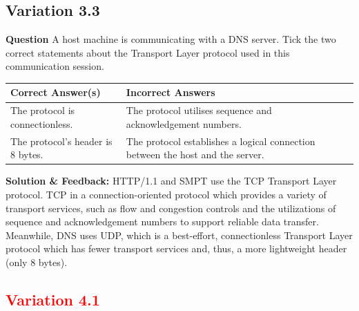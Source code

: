 \subsection{Variation 3.3}
\textbf{Question} A host machine is communicating with a DNS server. Tick the two correct statements about the Transport Layer protocol used in this communication session. \\
\begin{tabularx}{\textwidth}{|X|X|}
    \hline
    \textbf{Correct Answer(s)} & \textbf{Incorrect Answers} \\
    \hline
    The protocol is connectionless. & The protocol utilises sequence and acknowledgement numbers. \\
    The protocol's header is 8 bytes. & The protocol establishes a logical connection between the host and the server. \\
    \hline
\end{tabularx}

\textbf{Solution \& Feedback:}
{\color{red}
HTTP/1.1 and SMPT use the TCP Transport Layer protocol. TCP in a connection-oriented protocol which provides a variety of transport services, such as flow and congestion controls and the utilizations of sequence and acknowledgement numbers to support reliable data transfer. 
Meanwhile, DNS uses UDP, which is a best-effort, connectionless Transport Layer protocol which has fewer transport services and, thus, a more lightweight header (only 8 bytes). \\
}
\subsection{\textcolor{red}{Variation 4.1}}

